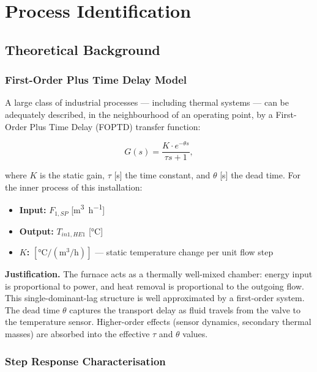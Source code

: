 \chapter{Process Identification}

\section{Theoretical Background}

\subsection{First-Order Plus Time Delay Model}

A large class of industrial processes --- including thermal systems --- can be adequately
described, in the neighbourhood of an operating point, by a First-Order Plus Time Delay
(FOPTD) transfer function:

\begin{equation}
  \boxed{G(s) = \frac{K \cdot e^{-\theta s}}{\tau s + 1}},
  \label{eq:foptd_id}
\end{equation}

where $K$ is the static gain, $\tau$ [\si{\second}] the time constant, and $\theta$
[\si{\second}] the dead time. For the inner process of this installation:

\begin{itemize}[leftmargin=*, itemsep=3pt]
  \item \textbf{Input:} $F_{1,SP}$ [\si{\metre\cubed\per\hour}]
  \item \textbf{Output:} $T_{in1,HE1}$ [\si{\degreeCelsius}]
  \item \textbf{$K$:} $[\si{\degreeCelsius}/(\si{\metre\cubed\per\hour})]$ ---
        static temperature change per unit flow step
\end{itemize}

\textbf{Justification.} The furnace acts as a thermally well-mixed chamber: energy input
is proportional to power, and heat removal is proportional to the outgoing flow. This
single-dominant-lag structure is well approximated by a first-order system. The dead time
$\theta$ captures the transport delay as fluid travels from the valve to the temperature
sensor. Higher-order effects (sensor dynamics, secondary thermal masses) are absorbed into
the effective $\tau$ and $\theta$ values.

\subsection{Step Response Characterisation}

